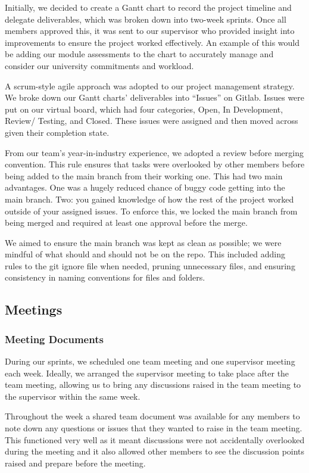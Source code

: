 \documentclass{article}
\begin{document}
Initially, we decided to create a Gantt chart to record the project timeline
and delegate deliverables, which was broken down into two-week sprints. Once
all members approved this, it was sent to our supervisor who provided insight
into improvements to ensure the project worked effectively. An example of this
would be adding our module assessments to the chart to accurately manage and
consider our university commitments and workload.

A scrum-style agile approach was adopted to our project management strategy. We
broke down our Gantt charts’ deliverables into “Issues” on Gitlab. Issues were
put on our virtual board, which had four categories, Open, In Development,
Review/ Testing, and Closed. These issues were assigned and then moved across
given their completion state.

From our team’s year-in-industry experience, we adopted a review before merging
convention. This rule ensures that tasks were overlooked by other members
before being added to the main branch from their working one. This had two main
advantages. One was a hugely reduced chance of buggy code getting into the main
branch. Two: you gained knowledge of how the rest of the project worked outside
of your assigned issues. To enforce this, we locked the main branch from being
merged and required at least one approval before the merge.

We aimed to ensure the main branch was kept as clean as possible; we were
mindful of what should and should not be on the repo. This included adding
rules to the git ignore file when needed, pruning unnecessary files, and
ensuring consistency in naming conventions for files and folders.

\subsection{Meetings}
\subsubsection{Meeting Documents}
During our sprints, we scheduled one team meeting and one supervisor meeting
each week. Ideally, we arranged the supervisor meeting to take place after the
team meeting, allowing us to bring any discussions raised in the team meeting
to the supervisor within the same week.

Throughout the week a shared team document was available for any members to
note down any questions or issues that they wanted to raise in the team
meeting. This functioned very well as it meant discussions were not
accidentally overlooked during the meeting and it also allowed other members to
see the discussion points raised and prepare before the meeting.
\end{document}
